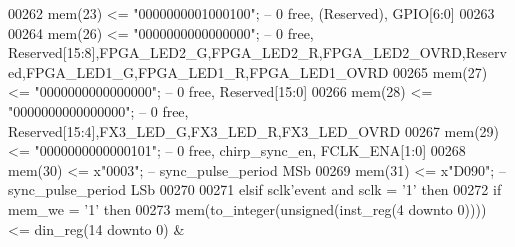 \begin{DoxyCode}
00262             \textcolor{vhdlchar}{mem}\textcolor{vhdlchar}{(}\textcolor{vhdllogic}{}\textcolor{vhdllogic}{23}\textcolor{vhdlchar}{)} \textcolor{vhdlchar}{<=} \textcolor{vhdllogic}{"0000000001000100"};\textcolor{keyword}{ --  0 free, (Reserved), GPIO[6:0]    }
00263             
00264             \textcolor{vhdlchar}{mem}\textcolor{vhdlchar}{(}\textcolor{vhdllogic}{}\textcolor{vhdllogic}{26}\textcolor{vhdlchar}{)} \textcolor{vhdlchar}{<=} \textcolor{vhdllogic}{"0000000000000000"};\textcolor{keyword}{ --  0 free,
       Reserved[15:8],FPGA\_LED2\_G,FPGA\_LED2\_R,FPGA\_LED2\_OVRD,Reserved,FPGA\_LED1\_G,FPGA\_LED1\_R,FPGA\_LED1\_OVRD}
00265             \textcolor{vhdlchar}{mem}\textcolor{vhdlchar}{(}\textcolor{vhdllogic}{}\textcolor{vhdllogic}{27}\textcolor{vhdlchar}{)} \textcolor{vhdlchar}{<=} \textcolor{vhdllogic}{"0000000000000000"};\textcolor{keyword}{ --  0 free, Reserved[15:0]}
00266             \textcolor{vhdlchar}{mem}\textcolor{vhdlchar}{(}\textcolor{vhdllogic}{}\textcolor{vhdllogic}{28}\textcolor{vhdlchar}{)} \textcolor{vhdlchar}{<=} \textcolor{vhdllogic}{"0000000000000000"};\textcolor{keyword}{ --  0 free, Reserved[15:4],FX3\_LED\_G,FX3\_LED\_R,FX3\_LED\_OVRD}
00267             \textcolor{vhdlchar}{mem}\textcolor{vhdlchar}{(}\textcolor{vhdllogic}{}\textcolor{vhdllogic}{29}\textcolor{vhdlchar}{)} \textcolor{vhdlchar}{<=} \textcolor{vhdllogic}{"0000000000000101"};\textcolor{keyword}{ --  0 free, chirp\_sync\_en, FCLK\_ENA[1:0]}
00268             \textcolor{vhdlchar}{mem}\textcolor{vhdlchar}{(}\textcolor{vhdllogic}{}\textcolor{vhdllogic}{30}\textcolor{vhdlchar}{)} \textcolor{vhdlchar}{<=} \textcolor{vhdlchar}{x}\textcolor{vhdllogic}{"0003"};\textcolor{keyword}{               --    sync\_pulse\_period MSb }
00269             \textcolor{vhdlchar}{mem}\textcolor{vhdlchar}{(}\textcolor{vhdllogic}{}\textcolor{vhdllogic}{31}\textcolor{vhdlchar}{)}  \textcolor{vhdlchar}{<=} \textcolor{vhdlchar}{x}\textcolor{keyword}{"D090"};\textcolor{keyword}{              -- sync\_pulse\_period LSb}
00270             
00271         \textcolor{keywordflow}{elsif} \textcolor{vhdlchar}{sclk}\textcolor{vhdlchar}{'}\textcolor{vhdlkeyword}{event} \textcolor{keywordflow}{and} \textcolor{vhdlchar}{sclk} \textcolor{vhdlchar}{=} \textcolor{vhdlchar}{'}\textcolor{vhdllogic}{}\textcolor{vhdllogic}{1}\textcolor{vhdlchar}{'} \textcolor{keywordflow}{then}
00272                 \textcolor{keywordflow}{if} \textcolor{vhdlchar}{mem_we} \textcolor{vhdlchar}{=} \textcolor{vhdlchar}{'}\textcolor{vhdllogic}{}\textcolor{vhdllogic}{1}\textcolor{vhdlchar}{'} \textcolor{keywordflow}{then}
00273                     \textcolor{vhdlchar}{mem}\textcolor{vhdlchar}{(}\textcolor{vhdlchar}{to\_integer}\textcolor{vhdlchar}{(}\textcolor{comment}{unsigned}\textcolor{vhdlchar}{(}\textcolor{vhdlchar}{inst_reg}\textcolor{vhdlchar}{(}\textcolor{vhdllogic}{}\textcolor{vhdllogic}{4} \textcolor{keywordflow}{downto} \textcolor{vhdllogic}{}\textcolor{vhdllogic}{0}\textcolor{vhdlchar}{)}\textcolor{vhdlchar}{)}\textcolor{vhdlchar}{)}\textcolor{vhdlchar}{)} \textcolor{vhdlchar}{<=} \textcolor{vhdlchar}{din_reg}\textcolor{vhdlchar}{(}\textcolor{vhdllogic}{}\textcolor{vhdllogic}{14} \textcolor{keywordflow}{downto} \textcolor{vhdllogic}{}\textcolor{vhdllogic}{0}\textcolor{vhdlchar}{)} \textcolor{vhdlchar}{&} \textcolor{vhdlchar}{
}
\end{DoxyCode}
